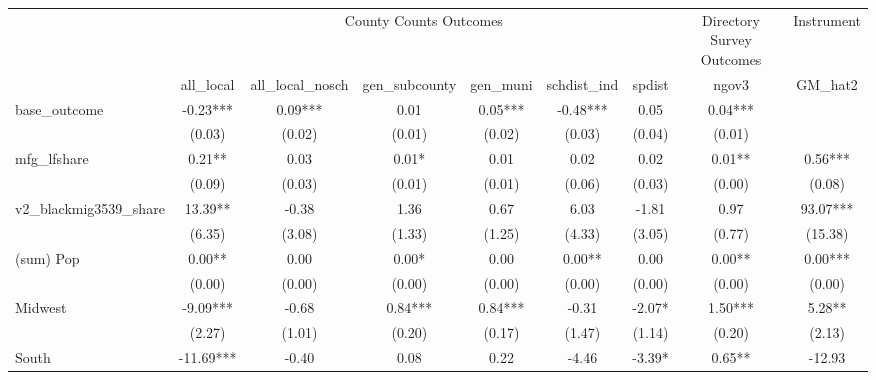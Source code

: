 {
\def\sym#1{\ifmmode^{#1}\else\(^{#1}\)\fi}
\begin{tabular}{l*{8}{c}}
\toprule
                &\multicolumn{6}{c}{County Counts Outcomes}                                               &\multicolumn{1}{c}{Directory Survey Outcomes}&\multicolumn{1}{c}{Instrument}\\\cmidrule(lr){2-7}\cmidrule(lr){8-8}\cmidrule(lr){9-9}
                &\multicolumn{1}{c}{all\_local}&\multicolumn{1}{c}{all\_local\_nosch}&\multicolumn{1}{c}{gen\_subcounty}&\multicolumn{1}{c}{gen\_muni}&\multicolumn{1}{c}{schdist\_ind}&\multicolumn{1}{c}{spdist}&\multicolumn{1}{c}{ngov3}&\multicolumn{1}{c}{GM\_hat2}\\
\midrule
base\_outcome    &      -0.23***&       0.09***&       0.01   &       0.05***&      -0.48***&       0.05   &       0.04***&              \\
                &     (0.03)   &     (0.02)   &     (0.01)   &     (0.02)   &     (0.03)   &     (0.04)   &     (0.01)   &              \\
\addlinespace
mfg\_lfshare     &       0.21** &       0.03   &       0.01*  &       0.01   &       0.02   &       0.02   &       0.01** &       0.56***\\
                &     (0.09)   &     (0.03)   &     (0.01)   &     (0.01)   &     (0.06)   &     (0.03)   &     (0.00)   &     (0.08)   \\
\addlinespace
v2\_blackmig3539\_share&      13.39** &      -0.38   &       1.36   &       0.67   &       6.03   &      -1.81   &       0.97   &      93.07***\\
                &     (6.35)   &     (3.08)   &     (1.33)   &     (1.25)   &     (4.33)   &     (3.05)   &     (0.77)   &    (15.38)   \\
\addlinespace
(sum) Pop       &       0.00** &       0.00   &       0.00*  &       0.00   &       0.00** &       0.00   &       0.00** &       0.00***\\
                &     (0.00)   &     (0.00)   &     (0.00)   &     (0.00)   &     (0.00)   &     (0.00)   &     (0.00)   &     (0.00)   \\
\addlinespace
Midwest         &      -9.09***&      -0.68   &       0.84***&       0.84***&      -0.31   &      -2.07*  &       1.50***&       5.28** \\
                &     (2.27)   &     (1.01)   &     (0.20)   &     (0.17)   &     (1.47)   &     (1.14)   &     (0.20)   &     (2.13)   \\
\addlinespace
South           &     -11.69***&      -0.40   &       0.08   &       0.22   &      -4.46   &      -3.39*  &       0.65** &     -12.93   \\

\end{tabular}}
